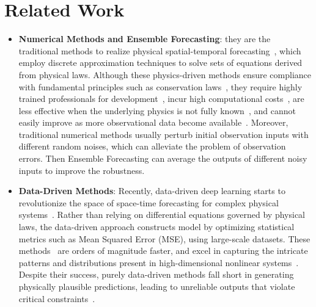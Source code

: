 \section{Related Work}
\label{sec:related_work}
\begin{itemize}
    \item \textbf{Numerical Methods and Ensemble Forecasting}: they are the traditional methods to realize physical spatial-temporal forecasting~\cite{jouvet2009numerical, rogallo1984numerical, orszag1974numerical, griebel1998numerical}, which employ discrete approximation techniques to solve sets of equations derived from physical laws. Although these physics-driven methods ensure compliance with fundamental principles such as conservation laws~\cite{karpatne2017theory,karnopp2012system,pukrushpan2004control}, they require highly trained professionals for development~\cite{lam2022graphcast}, incur high computational costs~\cite{pathak2022fourcastnet}, are less effective when the underlying physics is not fully known~\cite{takamoto2022pdebench}, and cannot easily improve as more observational data become available~\cite{lam2022graphcast}.
    Moreover, traditional numerical methods usually perturb initial observation inputs with different random noises, which can alleviate the problem of observation errors.  
    Then Ensemble Forecasting \cite{LEUTBECHER20083515, karlbauer2024advancing} can average the outputs of different noisy inputs to improve the robustness.
    
    \item \textbf{Data-Driven Methods}: Recently, data-driven deep learning starts to revolutionize the space of space-time forecasting for complex physical systems~\cite{gao2022earthformer, wu2024earthfarsser, li2020fourier, tan2022simvp, shi2015convolutional, pathak2022fourcastnet, wu2023pastnet,bi2023accurate,lam2022graphcast,zhang2023skilful}. Rather than relying on differential equations governed by physical laws, the data-driven approach constructs model by optimizing statistical metrics such as Mean Squared Error (MSE), using large-scale datasets. These methods~\cite{wang2022predrnn, shi2015convolutional, wang2018eidetic, tan2022simvp, gao2022earthformer, wu2024earthfarsser} are orders of magnitude faster, and excel in capturing the intricate patterns and distributions present in high-dimensional nonlinear systems~\cite{pathak2022fourcastnet}. Despite their success, purely data-driven methods fall short in generating physically plausible predictions, leading to unreliable outputs that violate critical constraints~\cite{bi2023accurate, pathak2022fourcastnet, wu2024neural}.


\end{itemize}
